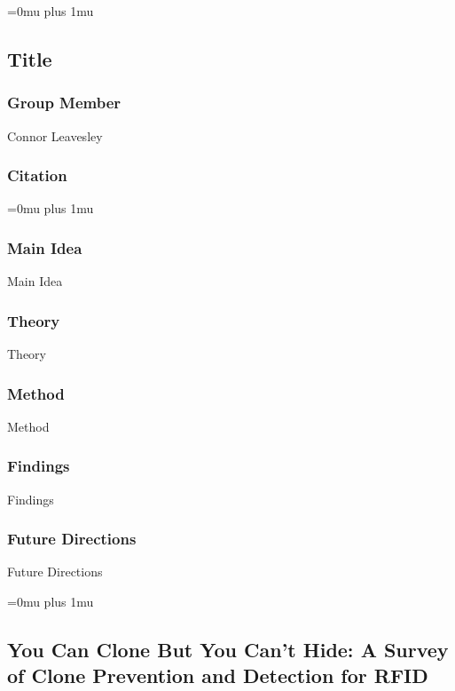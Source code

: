 \Urlmuskip=0mu plus 1mu\relax

\noindent
\subsection{Title}

\subsubsection{Group Member}

\noindent
Connor Leavesley

\noindent
\subsubsection{Citation}

\Urlmuskip=0mu plus 1mu\relax

\subsubsection{Main Idea}

\noindent
Main Idea

\subsubsection{Theory}

\noindent
Theory

\subsubsection{Method}

\noindent
Method

\subsubsection{Findings}

\noindent
Findings

\subsubsection{Future Directions}

\noindent
Future Directions 

\Urlmuskip=0mu plus 1mu\relax

\noindent
\subsection{{Y}ou {C}an {C}lone {B}ut {Y}ou {C}an't {H}ide: {A} {S}urvey of {C}lone {P}revention and {D}etection for {RFID}}

